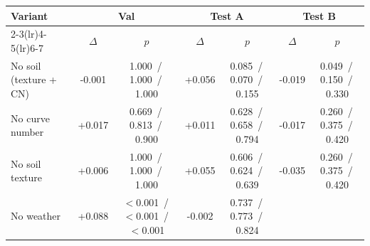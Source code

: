 \begin{tabular}{lcccccc}
\toprule
Variant & \multicolumn{2}{c}{Val} & \multicolumn{2}{c}{Test A} & \multicolumn{2}{c}{Test B} \\
\cmidrule(lr){2-3}\cmidrule(lr){4-5}\cmidrule(lr){6-7}
 & $\Delta$ & $p$ & $\Delta$ & $p$ & $\Delta$ & $p$ \\
\midrule
No soil (texture + CN)
& -0.001%
& 1.000%
\,/\,1.000%
\,/\,1.000%
& +0.056%
& 0.085%
\,/\,0.070%
\,/\,0.155%
& -0.019%
& 0.049%
\,/\,0.150%
\,/\,0.330%
\\
No curve number
& +0.017%
& 0.669%
\,/\,0.813%
\,/\,0.900%
& +0.011%
& 0.628%
\,/\,0.658%
\,/\,0.794%
& -0.017%
& 0.260%
\,/\,0.375%
\,/\,0.420%
\\
No soil texture
& +0.006%
& 1.000%
\,/\,1.000%
\,/\,1.000%
& +0.055%
& 0.606%
\,/\,0.624%
\,/\,0.639%
& -0.035%
& 0.260%
\,/\,0.375%
\,/\,0.420%
\\
No weather
& +0.088%
& $<$0.001%
\,/\,$<$0.001%
\,/\,$<$0.001%
& -0.002%
& 0.737%
\,/\,0.773%
\,/\,0.824%

\end{tabular}
